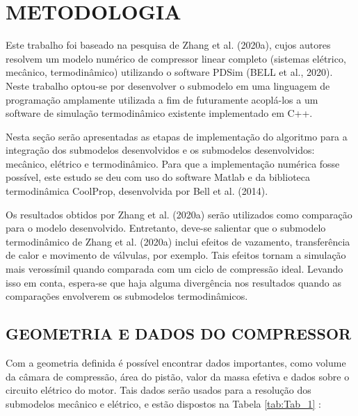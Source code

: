 \chapter{METODOLOGIA}


Este trabalho foi baseado na pesquisa de Zhang et al. (2020a), cujos autores resolvem um modelo numérico de compressor linear completo (sistemas elétrico, mecânico,  termodinâmico) utilizando o software PDSim (BELL et al., 2020). Neste trabalho optou-se por desenvolver o submodelo em uma linguagem de programação amplamente utilizada a fim de futuramente acoplá-los a um software de simulação termodinâmico existente implementado em C++.

Nesta seção serão apresentadas as etapas de implementação do algoritmo para a integração dos submodelos desenvolvidos e os submodelos desenvolvidos: mecânico, elétrico e termodinâmico. Para que a implementação numérica fosse possível, este estudo se deu com uso do software Matlab e da biblioteca termodinâmica CoolProp, desenvolvida por Bell et al. (2014).

Os resultados obtidos por Zhang et al. (2020a) serão utilizados como comparação para o modelo desenvolvido. Entretanto, deve-se salientar que o submodelo termodinâmico de Zhang et al. (2020a) inclui efeitos de vazamento, transferência de calor e movimento de válvulas, por exemplo. Tais efeitos tornam a simulação mais verossímil quando comparada com um ciclo de compressão ideal. Levando isso em conta, espera-se que haja alguma divergência nos resultados quando as comparações envolverem os submodelos termodinâmicos.

\section{GEOMETRIA E DADOS DO COMPRESSOR}

Com a geometria definida é possível encontrar dados importantes, como volume da câmara de compressão, área do pistão, valor da massa efetiva e dados sobre o circuito elétrico do motor. Tais dados serão usados para a resolução dos submodelos mecânico e elétrico, e estão dispostos na Tabela \ref{tab:Tab_1} :







